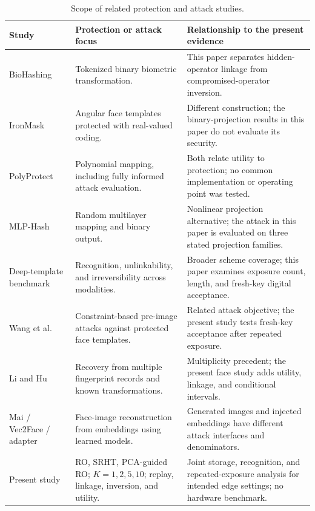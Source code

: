 \begin{table}[t]
\caption{Scope of related protection and attack studies.}
\label{tab:priorcomparison}\centering\footnotesize
\begin{tabularx}{\textwidth}{@{}>{\raggedright\arraybackslash}p{2.7cm}>{\raggedright\arraybackslash}X>{\raggedright\arraybackslash}X@{}}\toprule
Study & Protection or attack focus & Relationship to the present evidence\\\midrule
BioHashing~\cite{teoh2004biohashing} & Tokenized binary biometric transformation. & This paper separates hidden-operator linkage from compromised-operator inversion.\\[3pt]
IronMask~\cite{ironmask} & Angular face templates protected with real-valued coding. & Different construction; the binary-projection results in this paper do not evaluate its security.\\[3pt]
PolyProtect~\cite{polyprotect} & Polynomial mapping, including fully informed attack evaluation. & Both relate utility to protection; no common implementation or operating point was tested.\\[3pt]
MLP-Hash~\cite{mlphash} & Random multilayer mapping and binary output. & Nonlinear projection alternative; the attack in this paper is evaluated on three stated projection families.\\[3pt]
Deep-template benchmark~\cite{benchmark2026} & Recognition, unlinkability, and irreversibility across modalities. & Broader scheme coverage; this paper examines exposure count, length, and fresh-key digital acceptance.\\[3pt]
Wang et al.~\cite{wang2021csa} & Constraint-based pre-image attacks against protected face templates. & Related attack objective; the present study tests fresh-key acceptance after repeated exposure.\\[3pt]
Li and Hu~\cite{li2014multiplicity} & Recovery from multiple fingerprint records and known transformations. & Multiplicity precedent; the present face study adds utility, linkage, and conditional intervals.\\[3pt]
Mai / Vec2Face / adapter~\cite{mai2019reconstruction,vec2face,shahreza2024adapter} & Face-image reconstruction from embeddings using learned models. & Generated images and injected embeddings have different attack interfaces and denominators.\\[3pt]
Present study & RO, SRHT, PCA-guided RO; $K=1,2,5,10$; replay, linkage, inversion, and utility. & Joint storage, recognition, and repeated-exposure analysis for intended edge settings; no hardware benchmark.\\\bottomrule
\end{tabularx}
\end{table}
